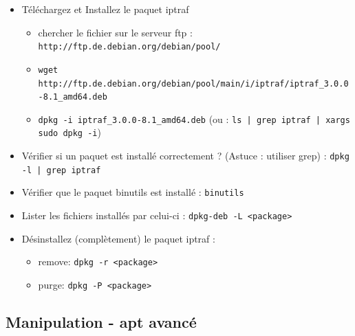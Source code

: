 \documentclass[a4paper]{article}
\begin{document}
\begin{itemize}

\item Téléchargez et Installez le paquet iptraf
\begin{example}
    \begin{itemize}
        \item chercher le fichier sur le serveur ftp : \texttt{http://ftp.de.debian.org/debian/pool/}
        \item \texttt{wget http://ftp.de.debian.org/debian/pool/main/i/iptraf/iptraf\_3.0.0-8.1\_amd64.deb}
        \item \texttt{dpkg -i iptraf\_3.0.0-8.1\_amd64.deb} (ou : \texttt{ls | grep iptraf | xargs sudo dpkg -i})
    \end{itemize}
\end{example}

\item Vérifier si un paquet est installé correctement ? (Astuce : utiliser grep) : \texttt{dpkg -l | grep iptraf}

\item Vérifier que le paquet binutils est installé : \texttt{binutils}

\item Lister les fichiers installés par celui-ci : \texttt{dpkg-deb -L <package>}

\item Désinstallez (complètement) le paquet iptraf :
\begin{itemize}
    \item remove: \texttt{dpkg -r <package>}
    \item purge: \texttt{dpkg -P <package>}
\end{itemize}

\end{itemize}










\subsection{Manipulation - apt avancé}
\end{document}
